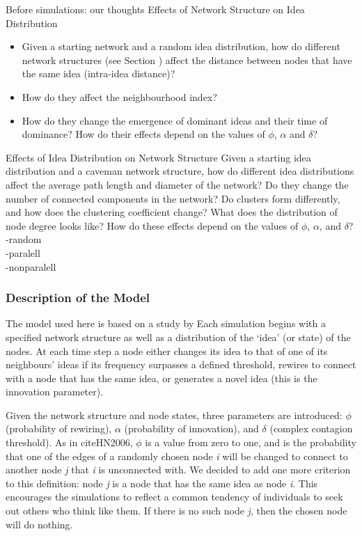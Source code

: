 \documentclass{beamer}
\begin{document}
%
\begin{frame}
{Before simulations: our thoughts}
{Effects of Network Structure on Idea Distribution}
\begin{itemize}
\item Given a starting network and a random idea distribution, how do different network structures (see Section ) affect the distance between nodes that have the same idea (intra-idea distance)? 
\item How do they affect the neighbourhood index? 
\item How do they change the emergence of dominant ideas and their time of dominance? How do their effects depend on the values of $\phi$, $\alpha$ and $\delta$?
\end{itemize}
\end{frame}
%
\begin{frame}
{Effects of Idea Distribution on Network Structure}
Given a starting idea distribution and a caveman network structure, how do different idea distributions affect the average path length and diameter of the network? Do they change the number of connected components in the network? Do clusters form differently, and how does the clustering coefficient change? What does the distribution of node degree looks like? How do these effects depend on the values of $\phi$, $\alpha$, and $\delta$?
-random\\
-paralell\\
-nonparalell\\
\end{frame}
%
\begin{frame}
\frametitle{Description of the Model}

The model used here is based on a study by %
  Each simulation begins with a specified network structure as well as a distribution of the `idea' (or state) of the nodes. At each time step a node either changes its idea to that of one of its neighbours' ideas if its frequency surpasses a defined threshold, rewires to connect with a node that has the same idea, or generates a novel idea (this is the innovation parameter). 
\end{frame}
%
\begin{frame}
Given the network structure and node states, three parameters are introduced: $\phi$ (probability of rewiring), $\alpha$ (probability of innovation), and $\delta$ (complex contagion threshold). As in \alert {cite{HN2006}}, $\phi$ is a value from zero to one, and is the probability that one of the edges of a randomly chosen node \emph{i} will be changed to connect to another node \emph{j} that \emph{i} is unconnected with. We decided to add one more criterion to this definition: node \emph{j} is a node that has the same idea as node \emph{i}. This encourages the simulations to reflect a common tendency of individuals to seek out others who think like them. If there is no such node \emph{j}, then the chosen node will do nothing.
\end{frame}
\end{document}
